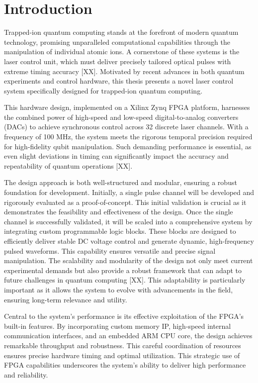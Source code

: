 \chapter{Introduction}

Trapped-ion quantum computing stands at the forefront of modern quantum technology, promising unparalleled computational capabilities through the manipulation of individual atomic ions. A cornerstone of these systems is the laser control unit, which must deliver precisely tailored optical pulses with extreme timing accuracy [XX]. Motivated by recent advances in both quantum experiments and control hardware, this thesis presents a novel laser control system specifically designed for trapped-ion quantum computing.

This hardware design, implemented on a Xilinx Zynq FPGA platform, harnesses the combined power of high-speed and low-speed digital-to-analog converters (DACs) to achieve synchronous control across 32 discrete laser channels. With a frequency of 100 MHz, the system meets the rigorous temporal precision required for high-fidelity qubit manipulation. Such demanding performance is essential, as even slight deviations in timing can significantly impact the accuracy and repeatability of quantum operations [XX].

The design approach is both well-structured and modular, ensuring a robust foundation for development. Initially, a single pulse channel will be developed and rigorously evaluated as a proof-of-concept. This initial validation is crucial as it demonstrates the feasibility and effectiveness of the design. Once the single channel is successfully validated, it will be scaled into a comprehensive system by integrating custom programmable logic blocks. These blocks are designed to efficiently deliver stable DC voltage control and generate dynamic, high-frequency pulsed waveforms. This capability ensures versatile and precise signal manipulation. The scalability and modularity of the design not only meet current experimental demands but also provide a robust framework that can adapt to future challenges in quantum computing [XX]. This adaptability is particularly important as it allows the system to evolve with advancements in the field, ensuring long-term relevance and utility.

Central to the system's performance is its effective exploitation of the FPGA's built-in features. By incorporating custom memory IP, high-speed internal communication interfaces, and an embedded ARM CPU core, the design achieves remarkable throughput and robustness. This careful coordination of resources ensures precise hardware timing and optimal utilization. This strategic use of FPGA capabilities underscores the system's ability to deliver high performance and reliability.
